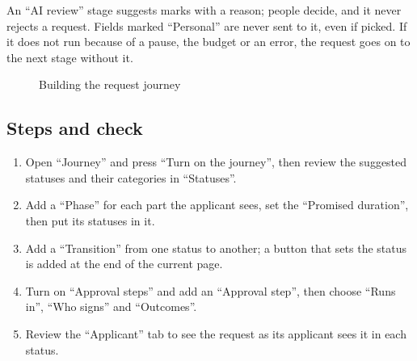 \begin{rcwarn}
An “AI review” stage suggests marks with a reason; people decide, and it never rejects a request. Fields marked “Personal” are never sent to it, even if picked. If it does not run because of a pause, the budget or an error, the request goes on to the next stage without it.
\end{rcwarn}

\begin{figure}[H]
\centering
{}
\rclegend
\caption{Building the request journey}
\label{fig:builder-forms-journey-flow}
\end{figure}

\subsection{Steps and check}
\begin{enumerate}
\item Open “Journey” and press “Turn on the journey”, then review the suggested statuses and their categories in “Statuses”.
\item Add a “Phase” for each part the applicant sees, set the “Promised duration”, then put its statuses in it.
\item Add a “Transition” from one status to another; a button that sets the status is added at the end of the current page.
\item Turn on “Approval steps” and add an “Approval step”, then choose “Runs in”, “Who signs” and “Outcomes”.
\item Review the “Applicant” tab to see the request as its applicant sees it in each status.
\end{enumerate}

